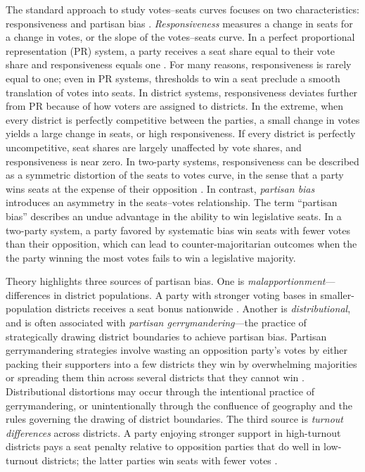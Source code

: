 \documentclass[letter,12pt]{article}
\begin{document}
The standard approach to study votes--seats curves focuses on two characteristics: responsiveness and partisan bias \citep{tufte1973seatsVotes,king.browning1987biasRespUS}. \emph{Responsiveness} measures a change in seats for a change in votes, or the slope of the votes--seats curve. In a perfect proportional representation (PR) system, a party receives a seat share equal to their vote share and responsiveness equals one \citep{taagepera.shugart.1989,linzerSeatVoteElasticity2012}. For many reasons, responsiveness is rarely equal to one; even in PR systems, thresholds to win a seat preclude a smooth translation of votes into seats. In district systems, responsiveness deviates further from PR because of how voters are assigned to districts. In the extreme, when every district is perfectly competitive between the parties, a small change in votes yields a large change in seats, or high responsiveness. If every district is perfectly uncompetitive, seat shares are largely unaffected by vote shares, and responsiveness is near zero. In two-party systems, responsiveness can be described as a symmetric distortion of the seats to votes curve, in the sense that a party wins seats at the expense of their opposition \citep{grofman.king.2008.partisansymmetry}. In contrast, \emph{partisan bias} introduces an asymmetry in the seats--votes relationship. The term ``partisan bias'' describes an undue advantage in the ability to win legislative seats. In a two-party system, a party favored by systematic bias win seats with fewer votes than their opposition, which can lead to counter-majoritarian outcomes when the the party winning the most votes fails to win a legislative majority.

Theory highlights three sources of partisan bias. One is \emph{malapportionment}---differences in district populations. A party with stronger voting bases in smaller-population districts receives a seat bonus nationwide \citep{johnston.2002,jackmanMeasuringBias1994}. Another is \emph{distributional}, and is often associated with \emph{partisan gerrymandering}---the practice of strategically drawing district boundaries to achieve partisan bias. Partisan gerrymandering strategies involve wasting an opposition party's votes by either packing their supporters into a few districts they win by overwhelming majorities or spreading them thin across several districts that they cannot win \citep{owen.grofman.1988.partisangerrymandering,cox.katz.2002,engstrom2006redisttrictApsr}. Distributional distortions may occur through the intentional practice of gerrymandering, or unintentionally through the confluence of geography and the rules governing the drawing of district boundaries. The third source is \emph{turnout differences} across districts. A party enjoying stronger support in high-turnout districts pays a seat penalty relative to opposition parties that do well in low-turnout districts; the latter parties win seats with fewer votes \citep{campbellTurnoutBias1996,rosenstone.hansen.1993}.  
\end{document}

